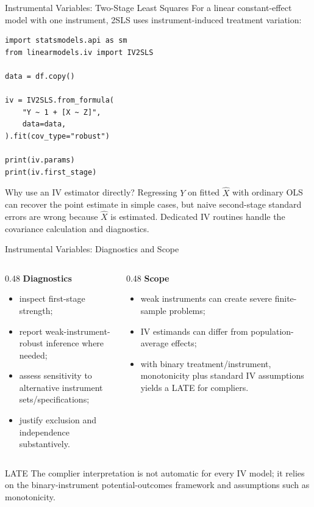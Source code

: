 \documentclass[aspectratio=169,11pt]{beamer}
\begin{document}
\begin{frame}[fragile]{Instrumental Variables: Two-Stage Least Squares}
For a linear constant-effect model with one instrument, 2SLS uses instrument-induced treatment variation:

\begin{lstlisting}[style=code,basicstyle=\ttfamily\small]
import statsmodels.api as sm
from linearmodels.iv import IV2SLS

data = df.copy()

iv = IV2SLS.from_formula(
    "Y ~ 1 + [X ~ Z]",
    data=data,
).fit(cov_type="robust")

print(iv.params)
print(iv.first_stage)
\end{lstlisting}

\begin{block}{Why use an IV estimator directly?}
Regressing $Y$ on fitted $\hat X$ with ordinary OLS can recover the point estimate in simple cases, but naive second-stage standard errors are wrong because $\hat X$ is estimated. Dedicated IV routines handle the covariance calculation and diagnostics.
\end{block}
\end{frame}

\begin{frame}{Instrumental Variables: Diagnostics and Scope}
\begin{columns}
\begin{column}{0.48\textwidth}
\textbf{Diagnostics}
\begin{itemize}
  \item inspect first-stage strength;
  \item report weak-instrument-robust inference where needed;
  \item assess sensitivity to alternative instrument sets/specifications;
  \item justify exclusion and independence substantively.
\end{itemize}
\end{column}

\begin{column}{0.48\textwidth}
\textbf{Scope}
\begin{itemize}
  \item weak instruments can create severe finite-sample problems;
  \item IV estimands can differ from population-average effects;
  \item with binary treatment/instrument, monotonicity plus standard IV assumptions yields a LATE for compliers.
\end{itemize}
\end{column}
\end{columns}

\begin{alertblock}{LATE}
The complier interpretation is not automatic for every IV model; it relies on the binary-instrument potential-outcomes framework and assumptions such as monotonicity.
\end{alertblock}
\end{frame}
\end{document}
